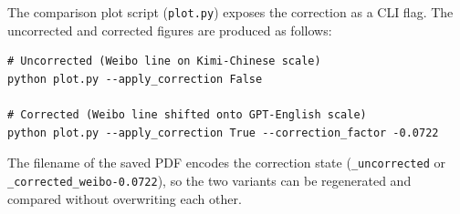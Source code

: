 The comparison plot script (\texttt{plot.py}) exposes the correction as
a CLI flag. The uncorrected and corrected figures are produced as
follows:

\begin{verbatim}
# Uncorrected (Weibo line on Kimi-Chinese scale)
python plot.py --apply_correction False

# Corrected (Weibo line shifted onto GPT-English scale)
python plot.py --apply_correction True --correction_factor -0.0722
\end{verbatim}

The filename of the saved PDF encodes the correction state
(\texttt{\_uncorrected} or \texttt{\_corrected\_weibo-0.0722}), so the
two variants can be regenerated and compared without overwriting each
other.
